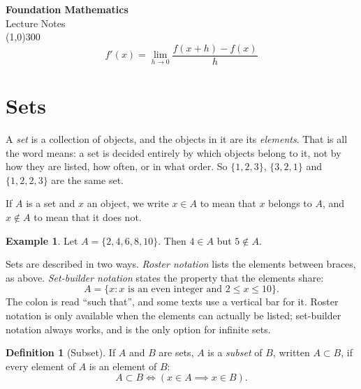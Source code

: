 \documentclass[11pt,a4paper]{article}
\theoremstyle{definition}
\newtheorem{definition}[thm]{Definition}
\newtheorem{example}[thm]{Example}
\begin{document}
\begin{titlepage}
\begin{center}
\vspace*{3cm}
{\Huge\bfseries Foundation Mathematics}\\[1.2cm]
{\large Lecture Notes}\\[2.5cm]
\line(1,0){300}\\[1.5cm]
$$f'(x)=\lim_{h\to 0}\frac{f(x+h)-f(x)}{h}$$
\end{center}
\end{titlepage}


\tableofcontents
\thispagestyle{empty}
\clearpage




\setcounter{page}{1}


\section{Sets}
A \emph{set} is a collection of objects, and the objects in it are its
\emph{elements}. That is all the word means: a set is decided entirely by which
objects belong to it, not by how they are listed, how often, or in what order. So
$\{1,2,3\}$, $\{3,2,1\}$ and $\{1,2,2,3\}$ are the same set.

If $A$ is a set and $x$ an object, we write $x\in A$ to mean that $x$ belongs to
$A$, and $x\notin A$ to mean that it does not.

\begin{example}
Let $A=\{2,4,6,8,10\}$. Then $4\in A$ but $5\notin A$.
\end{example}

Sets are described in two ways. \emph{Roster notation} lists the elements between
braces, as above. \emph{Set-builder notation} states the property that the
elements share:
$$A=\{x: x \text{ is an even integer and } 2\leq x\leq 10\}.$$
The colon is read ``such that'', and some texts use a vertical bar for it. Roster
notation is only available when the elements can actually be listed; set-builder
notation always works, and is the only option for infinite sets.

\begin{definition}[Subset]
If $A$ and $B$ are sets, $A$ is a \emph{subset} of $B$, written $A\subset B$, if
every element of $A$ is an element of $B$:
$$A\subset B \iff \left(x\in A \implies x\in B\right).$$
\end{definition}
\end{document}
